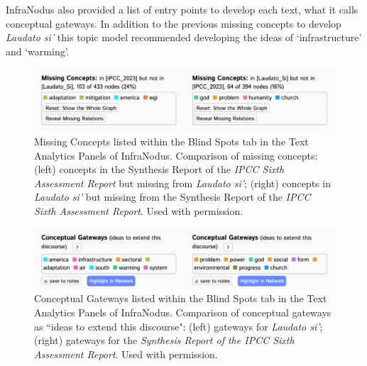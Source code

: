 InfraNodus also provided a list of entry points to develop each text, what it calls conceptual gateways. In addition to the previous missing concepts to develop \textit{Laudato si’} this topic model recommended developing the ideas of `infrastructure’ and `warming’. 

\FloatBarrier
\begin{figure}[h]
    \centering
    \includegraphics[width=0.8\linewidth]{figures/4.9.png}
    \caption[Missing Concepts listed within the Blind Spots tab in the Text Analytics Panels of InfraNodus]{ Missing Concepts listed within the Blind Spots tab in the Text Analytics Panels of InfraNodus. Comparison of missing concepts: (left) concepts in the Synthesis Report of the \textit{IPCC Sixth Assessment Report} but missing from \textit{Laudato si'}; (right) concepts in \textit{Laudato si'} but missing from the Synthesis Report of the \textit{IPCC Sixth Assessment Report}. Used with permission.}
    \label{fig:4.9}
\end{figure}

\begin{figure}[h]
    \centering
    \includegraphics[width=0.8\linewidth]{figures/4.10.png}
    \caption[Conceptual Gateways listed within the Blind Spots tab in the Text Analytics Panels of InfraNodus]{Conceptual Gateways listed within the Blind Spots tab in the Text Analytics Panels of InfraNodus.  Comparison of conceptual gateways as ``ideas to extend this discourse": (left) gateways for \textit{Laudato si'}; (right) gateways for the \textit{Synthesis Report of the IPCC Sixth Assessment Report}. Used with permission.
}
    \label{fig:4.10}
\end{figure}
\FloatBarrier
{}


